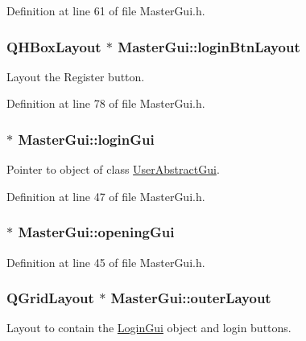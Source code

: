 Definition at line 61 of file Master\-Gui.\-h.

\hypertarget{class_master_gui_a719e8687a4a4522f1c1a2cb24a9808f4}{
\subsubsection[{login\-Btn\-Layout}]{\setlength{\rightskip}{0pt plus 5cm}Q\-H\-Box\-Layout $\ast$ Master\-Gui\-::login\-Btn\-Layout\hspace{0.3cm}{\ttfamily [private]}}}\label{class_master_gui_a719e8687a4a4522f1c1a2cb24a9808f4}
Layout the Register button. 

Definition at line 78 of file Master\-Gui.\-h.

\hypertarget{class_master_gui_a8ea61f0f1c30c7e7544261ae3c42aa71}{
\subsubsection[{login\-Gui}]{ $\ast$ Master\-Gui\-::login\-Gui\hspace{0.3cm}{\ttfamily [private]}}}\label{class_master_gui_a8ea61f0f1c30c7e7544261ae3c42aa71}
Pointer to object of class \hyperlink{class_user_abstract_gui}{User\-Abstract\-Gui}. 

Definition at line 47 of file Master\-Gui.\-h.

\hypertarget{class_master_gui_a2dba24deae06de661e132be0a2030829}{
\subsubsection[{opening\-Gui}]{ $\ast$ Master\-Gui\-::opening\-Gui\hspace{0.3cm}{\ttfamily [private]}}}\label{class_master_gui_a2dba24deae06de661e132be0a2030829}


Definition at line 45 of file Master\-Gui.\-h.

\hypertarget{class_master_gui_a172c1c5883371ed37f0cf1232eb2411a}{
\subsubsection[{outer\-Layout}]{\setlength{\rightskip}{0pt plus 5cm}Q\-Grid\-Layout $\ast$ Master\-Gui\-::outer\-Layout\hspace{0.3cm}{\ttfamily [private]}}}\label{class_master_gui_a172c1c5883371ed37f0cf1232eb2411a}
Layout to contain the \hyperlink{class_login_gui}{Login\-Gui} object and login buttons. 


